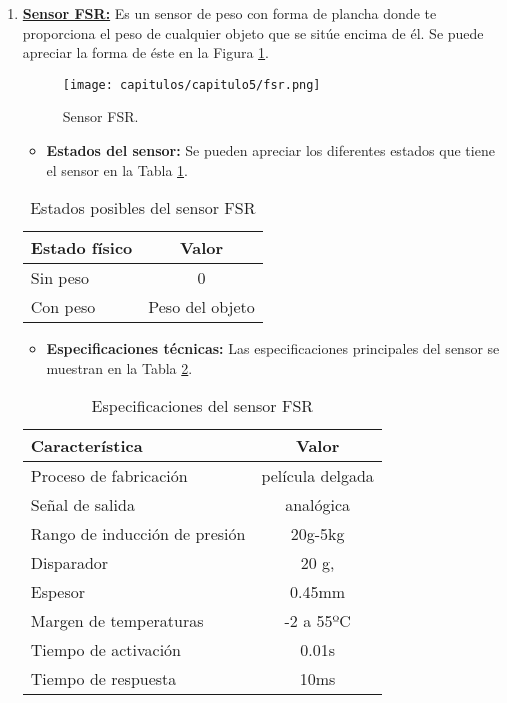 \begin{enumerate}

\item \underline{\textbf{Sensor FSR:}} Es un sensor de peso con forma de plancha donde te proporciona el peso de cualquier objeto que se sitúe encima de él. Se puede apreciar la forma de éste en la Figura \ref{fig:FSR}.

\begin{figure}[h] 
    \centering
    \texttt{[image: capitulos/capitulo5/fsr.png]}
    \caption{Sensor FSR.}
    \label{fig:FSR}
\end{figure}

\newpage
\begin{itemize}
    \item \textbf{Estados del sensor:} Se pueden apreciar los diferentes estados que tiene el sensor en la Tabla \ref{tab:FSR}.
\end{itemize}

\begin{table}[h]
    \centering
    \begin{tabular}{|l|c|}
        \rowcolor[gray]{.5}
        \hline
         \color{white}Estado físico&\color{white}Valor \\
         \hline
         Sin peso&0 \\
         \hline
         Con peso&Peso del objeto  \\
         \hline
    \end{tabular}
    \caption{Estados posibles del sensor FSR}
    \label{tab:FSR}
\end{table}

\begin{itemize}
    \item \textbf{Especificaciones técnicas:} Las especificaciones principales del sensor se muestran en la Tabla \ref{tab:FSResp}.
\end{itemize}

\begin{table}[h]
    \centering
    \begin{tabular}{|l|c|}
        \rowcolor[gray]{.5}
        \hline
            \color{white}Característica&\color{white}Valor  \\
        \hline
            Proceso de fabricación & película delgada  \\
        \hline    
            Señal de salida & analógica  \\
        \hline    
            Rango de inducción de presión & 20g-5kg  \\
        \hline    
            Disparador & 20 g, \\
        \hline    
            Espesor & 0.45mm  \\
        \hline    
            Margen de temperaturas & -2 a 55ºC \\
        \hline    
            Tiempo de activación & 0.01s  \\
        \hline    
            Tiempo de respuesta & 10ms  \\
         \hline
    \end{tabular}
    \caption{Especificaciones del sensor FSR}
    \label{tab:FSResp}
\end{table}


\end{enumerate}
